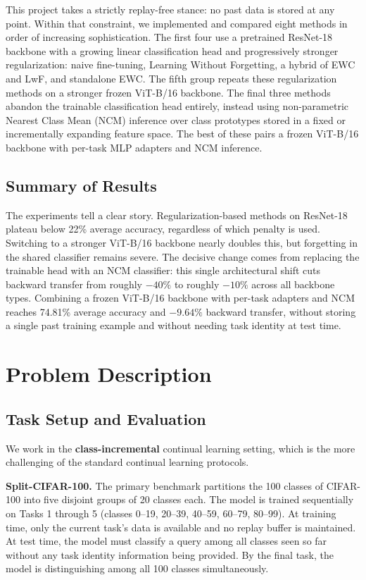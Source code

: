 \documentclass{article}
\begin{document}
This project takes a strictly replay-free stance: no past data is stored at any
point. Within that constraint, we implemented and compared eight methods in order
of increasing sophistication. The first four use a pretrained ResNet-18 backbone
with a growing linear classification head and progressively stronger
regularization: naive fine-tuning, Learning Without Forgetting, a hybrid of EWC
and LwF, and standalone EWC. The fifth group repeats these regularization methods
on a stronger frozen ViT-B/16 backbone. The final three methods abandon the
trainable classification head entirely, instead using non-parametric Nearest
Class Mean (NCM) inference over class prototypes stored in a fixed or
incrementally expanding feature space. The best of these pairs a frozen
ViT-B/16 backbone with per-task MLP adapters and NCM inference.

\subsection{Summary of Results}

The experiments tell a clear story. Regularization-based methods on ResNet-18
plateau below 22\% average accuracy, regardless of which penalty is used.
Switching to a stronger ViT-B/16 backbone nearly doubles this, but forgetting
in the shared classifier remains severe. The decisive change comes from replacing
the trainable head with an NCM classifier: this single architectural shift cuts
backward transfer from roughly $-40\%$ to roughly $-10\%$ across all backbone
types. Combining a frozen ViT-B/16 backbone with per-task adapters and NCM
reaches 74.81\% average accuracy and $-9.64\%$ backward transfer, without
storing a single past training example and without needing task identity at
test time.

\section{Problem Description}
\label{sec:problem}

\subsection{Task Setup and Evaluation}

We work in the \textbf{class-incremental} continual learning setting, which is
the more challenging of the standard continual learning protocols.

\textbf{Split-CIFAR-100.} The primary benchmark partitions the 100 classes
of CIFAR-100 \citep{zenke2017continual} into five disjoint groups of 20 classes
each. The model is trained sequentially on Tasks 1 through 5 (classes 0--19,
20--39, 40--59, 60--79, 80--99). At training time, only the current task's data
is available and no replay buffer is maintained. At test time, the model must
classify a query among all classes seen so far without any task identity
information being provided. By the final task, the model is distinguishing among
all 100 classes simultaneously.
\end{document}
